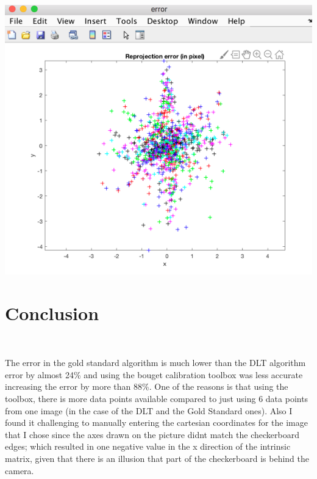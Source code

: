\documentclass[]{article}
\begin{document}
\includegraphics{calibration_error.png}
\section{Conclusion}\

The error in the gold standard algorithm is much lower than the DLT algorithm error by almost 24\% and using the bouget calibration toolbox was less accurate increasing the error by more than 88\%. One of the reasons is that using the toolbox, there is more data points available compared to just using 6 data points from one image (in the case of the DLT and the Gold Standard ones). Also I found it challenging to manually entering the cartesian coordinates for the image that I chose since the axes drawn on the picture didnt match the checkerboard edges; which resulted in one negative value in the x direction of the intrinsic matrix, given that there is an illusion that part of the checkerboard is behind the camera. 
\end{document}
